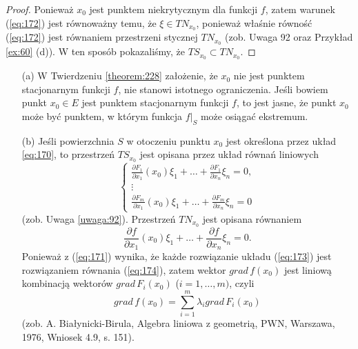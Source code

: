 \documentclass[leqno]{article}
\begin{document}
\begin{justify}
\begin{proof}
    Ponieważ $x_0$ jest punktem niekrytycznym dla funkcji $f$, zatem warunek (\ref{eq:172}) jest równoważny temu, że $\xi \in TN_{x_0}$, ponieważ 
właśnie równość (\ref{eq:172}) jest równaniem przestrzeni stycznej $TN_{x_0}$ (zob. Uwaga 92 oraz Przykład \ref{ex:60} (d)). W ten sposób pokazaliśmy, że $TS_{x_0} \subset TN_{x_0}$.
\end{proof}

\begin{uwaga}
    \begin{itemize}
        \item [(a)] W Twierdzeniu \ref{theorem:228} założenie, że $x_0$ nie jest punktem stacjonarnym funkcji $f$, nie stanowi istotnego ograniczenia.
            Jeśli bowiem punkt $x_0 \in E$ jest punktem stacjonarnym funkcji $f$, to jest jasne, że punkt $x_0$ może być punktem, w którym 
            funkcja $f|_S$ może osiągać ekstremum.
        \item [(b)]
            Jeśli powierzchnia $S$ w otoczeniu punktu $x_0$ jest określona przez układ \ref{eq:170}, to przestrzeń $TS_{x_0}$ jest opisana przez układ równań liniowych
            \begin{equation}\label{eq:173}
                \begin{cases}
                    \frac{\partial F_1}{\partial x_1}(x_0)\xi_1 + \ldots + \frac{\partial F_1}{\partial x_n}\xi_n = 0, \\
                    \vdots \\
                    \frac{\partial F_m}{\partial x_1}(x_0)\xi_1 + \ldots + \frac{\partial F_m}{\partial x_n}\xi_n = 0
                \end{cases}
            \end{equation}
            (zob. Uwaga \ref{uwaga:92}). Przestrzeń $TN_{x_0}$ jest opisana równaniem 
            \begin{equation}\label{eq:174}
                \frac{\partial f}{\partial x_1}(x_0)\xi_1 + \ldots + \frac{\partial f}{\partial x_n}\xi_n = 0.
            \end{equation}
            Ponieważ z (\ref{eq:171}) wynika, że każde rozwiązanie układu (\ref{eq:173}) jest rozwiązaniem równania (\ref{eq:174}), 
            zatem wektor $grad \, f(x_0)$ jest liniową kombinacją wektorów $grad \, F_i(x_0)$ ($ i = 1, \ldots, m)$, czyli 
            \begin{equation}\label{eq:175}
                grad \, f(x_0) = \sum_{i=1}^{m}\lambda_i grad \, F_i(x_0)
            \end{equation}
            (zob. A. Białynicki-Birula, Algebra liniowa z geometrią, PWN, Warszawa, 1976, Wniosek 4.9, s. 151).
    \end{itemize}
\end{uwaga}


\end{justify}
\end{document}
